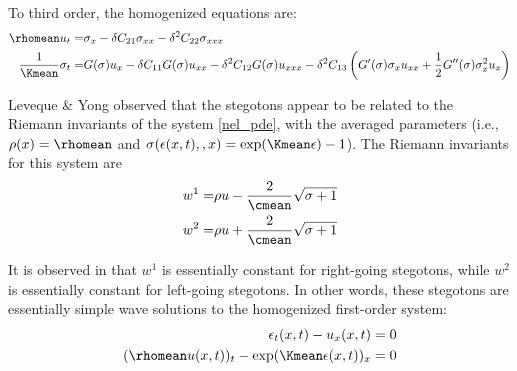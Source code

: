 To third order, the homogenized equations are:
\begin{subequations} \label{homeq} \begin{align}
\rhomean u_t = & \sigma_x - \delta C_{21}\sigma_{xx} 
  - \delta^2 C_{22} \sigma_{xxx} \\
\frac{1}{\Kmean}\sigma_t = & G(\sigma)u_x - \delta C_{11} G(\sigma) u_{xx}
  - \delta^2 C_{12} G(\sigma)u_{xxx} 
  - \delta^2 C_{13}\left(G'(\sigma)\sigma_x u_{xx} +\frac{1}{2}G''(\sigma)
  \sigma_x^2 u_x\right)
\end{align} \end{subequations} 

Leveque \& Yong \cite{leveque2002a} observed that the
stegotons appear to be related to the Riemann invariants of the 
system \eqref{nel_pde}, with the averaged parameters
(i.e., $\rho(x)=\rhomean$ and $\sigma(\epsilon(x,t),,x)=\exp(\Kmean\epsilon)-1$).
The Riemann invariants for this system are
\begin{subequations}
\begin{align}
w^1 = & \rho u - \frac{2}{\cmean}\sqrt{\sigma+1}\\
w^2 = & \rho u + \frac{2}{\cmean}\sqrt{\sigma+1}
\end{align}
\end{subequations}

It is observed in \cite{leveque2002a} that $w^1$ is essentially constant
for right-going stegotons, while $w^2$ is essentially constant for left-going
stegotons.  In other words, these stegotons are essentially simple wave solutions
to the homogenized first-order system:
\begin{subequations} \label{nel_pde_mean}
\begin{align}
\epsilon_t(x,t)-u_x(x,t) & = 0 \\
(\rhomean u(x,t))_t - \exp(\Kmean\epsilon(x,t))_x & = 0 
\end{align}
\end{subequations}


